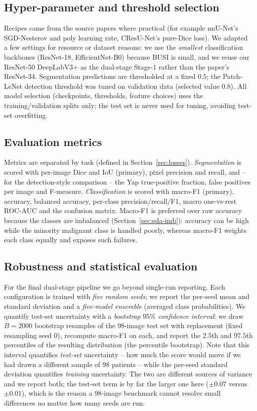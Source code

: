 \documentclass[11pt]{article}
\begin{document}
\subsection{Hyper-parameter and threshold selection}
\label{sec:setup-hparam}
Recipes came from the source papers where practical (for example nnU-Net's
SGD-Nesterov and poly learning rate, CResU-Net's pure-Dice loss). We adapted a few
settings for resource or dataset reasons: we use the \emph{smallest} classification
backbones (ResNet-18, EfficientNet-B0) because BUSI is small, and we reuse our
ResNet-50 DeepLabV3+ as the dual-stage Stage-1 rather than the paper's ResNet-34.
Segmentation predictions are thresholded at a fixed $0.5$; the Patch-LeNet
detection threshold was tuned on validation data (selected value $0.8$). All model
selection (checkpoints, thresholds, feature choices) uses the training/validation
splits only; the test set is never used for tuning, avoiding test-set overfitting.

\subsection{Evaluation metrics}
\label{sec:eval}
Metrics are separated by task (defined in Section~\ref{sec:losses}).
\emph{Segmentation} is scored with per-image Dice and IoU (primary), pixel
precision and recall, and -- for the detection-style comparison -- the Yap
true-positive fraction, false positives per image and F-measure.
\emph{Classification} is scored with macro-F1 (primary), accuracy, balanced
accuracy, per-class precision/recall/F1, macro one-vs-rest ROC-AUC and the
confusion matrix. Macro-F1 is preferred over raw accuracy because the classes are
imbalanced (Section~\ref{sec:eda-imb}): accuracy can be high while the minority
malignant class is handled poorly, whereas macro-F1 weights each class equally and
exposes such failures.

\subsection{Robustness and statistical evaluation}
\label{sec:setup-stats}
For the final dual-stage pipeline we go beyond single-run reporting. Each
configuration is trained with \emph{five random seeds}; we report the per-seed mean
and standard deviation and a \emph{five-model ensemble} (averaged class
probabilities). We quantify test-set uncertainty with a \emph{bootstrap $95\%$
confidence interval}: we draw $B=2000$ bootstrap resamples of the $98$-image test
set with replacement (fixed resampling seed $0$), recompute macro-F1 on each, and
report the $2.5$th and $97.5$th percentiles of the resulting distribution (the
percentile bootstrap). Note that this interval quantifies \emph{test-set}
uncertainty -- how much the score would move if we had drawn a different sample of
$98$ patients -- while the per-seed standard deviation quantifies \emph{training}
uncertainty. The two are different sources of variance and we report both;
the test-set term is by far the larger one here ($\pm0.07$ versus $\pm0.01$),
which is the reason a $98$-image benchmark cannot resolve small differences no
matter how many seeds are run.
\end{document}
